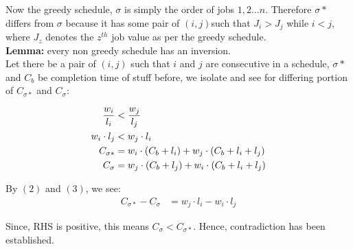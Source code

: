 \documentclass{article}
\begin{document}
	Now the greedy schedule, $\sigma$ is simply the order of jobs $1,2\ldots n$. Therefore $\sigma*$ differs from $\sigma$ because it has some pair of $(i,j) $such that $J_i > J_j$ while $i < j$, where $J_z$ denotes the $z^{th}$ job value as per the greedy schedule.  \\
	
	\textbf{Lemma:} every non greedy schedule has an inversion. \\
	
	Let there be a pair of $(i,j)$ such that $i$ and $j$ are consecutive in a schedule, $\sigma*$ and $C_b$ be completion time of stuff before, we isolate and see for differing portion of $C_{\sigma*}$ and $C_{\sigma}$:
	
	\begin{align}
		\frac{w_i}{l_i} &< \frac{w_j}{l_j} \notag \\
		w_i \cdot l_j &< w_j \cdot l_i \\
		C_{\sigma*}  &= w_i \cdot (C_b + l_i) + w_j \cdot (C_b + l_i + l_j) \\
		C_{\sigma} &= w_j \cdot (C_b + l_j) + w_i \cdot (C_b + l_i + l_j)
	\end{align}
	
	By $(2)$ and $(3)$, we see:
	\begin{align*}
		C_{\sigma*} - C_{\sigma}  &= w_j \cdot l_i - w_i \cdot l_j 
	\end{align*}
	
	Since, RHS is positive, this means $C_{\sigma} < C_{\sigma*}$. Hence, contradiction has been established.
	
	
\end{document}
